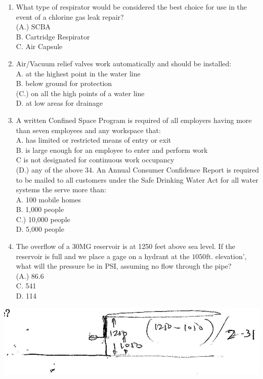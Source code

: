\documentclass[10pt]{article}
\begin{document}
\begin{enumerate}
  \item What type of respirator would be considered the best choice for use in the event of a chlorine gas leak repair?\\
(A.) $\mathrm{SCBA}$\\
B. Cartridge Respirator\\
C. Air Capsule

  \item Air/Vacuum relief valves work automatically and should be installed:\\
A. at the highest point in the water line\\
B. below ground for protection\\
(C.) on all the high points of a water line\\
D. at low areas for drainage

  \item A written Confined Space Program is required of all employers having more than seven employees and any workspace that:\\
A. has limited or restricted means of entry or exit\\
B. is large enough for an employee to enter and perform work\\
C is not designated for continuous work occupancy\\
(D.) any of the above 34. An Annual Consumer Confidence Report is required to be mailed to all customers under the Safe Drinking Water Act for all water systems the serve more than:\\
A. 100 mobile homes\\
B. 1,000 people\\
C.) 10,000 people\\
D. 5,000 people

  \item The overflow of a $30 \mathrm{MG}$ reservoir is at 1250 feet above sea level. If the reservoir is full and we place a gage on a hydrant at the $1050 \mathrm{ft}$. elevation', what will the pressure be in PSI, assuming no flow through the pipe?\\
(A.) $86.6$\\
C. 541\\
D. 114

\end{enumerate}

\includegraphics[max width=\textwidth]{2022_11_11_a5e8a54031fc138b833ag-5}
\end{document}
